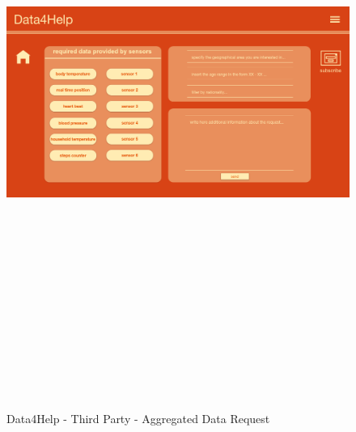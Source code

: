 \begin{figure}[H]
  \includegraphics[width=.6\linewidth, height = 20cm, keepaspectratio]{./Images/Mockups/Data4Help/D4HTP/D4HTP_AggregatedDataRequest.png}
  \centering
  \caption{Data4Help - Third Party - Aggregated Data Request}
  \label{fig:sab}
\end{figure}

